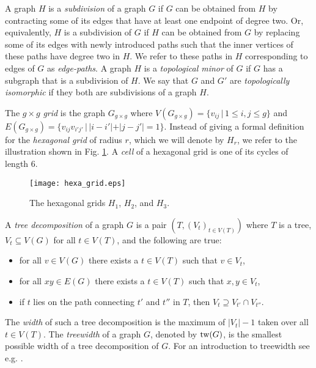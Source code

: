 \documentclass{llncs}
\begin{document}
A graph $H$ is a \emph{subdivision} of a graph $G$ if $G$ can be obtained from $H$
by contracting some of its edges that have at least one endpoint of degree two.
Or, equivalently, $H$ is a subdivision of $G$ if $H$ can be obtained from $G$ by
replacing some of its edges with newly introduced paths
such that the inner vertices of these paths have degree two in $H$.
We refer to these paths in $H$ corresponding to edges of $G$ as \emph{edge-paths}.
A graph $H$ is a \emph{topological minor} of $G$ if $G$ has a subgraph that is a subdivision of $H$.
We say that $G$ and $G'$ are \emph{topologically isomorphic} if they both are subdivisions of a graph $H$.

The $g \times g$ \emph{grid} is the graph $G_{g \times g}$ where
$V(G_{g \times g}) = \{v_{ij} \,|\, 1 \leq i,j \leq g \}$ and
$E(G_{g \times g}) = \{ v_{ij} v_{i'j'} \,|\, |i-i'|+|j-j'| = 1 \}$.
Instead of giving a formal definition for the \emph{hexagonal grid} of radius $r$,
which we will denote by $H_r$, we refer to the illustration shown in Fig. \ref{fig_hexa}.
A \emph{cell} of a hexagonal grid is one of its cycles of length $6$.

\begin{figure}[t]
\begin{center}
\texttt{[image: hexa\_grid.eps]}
\end{center}
\caption{The hexagonal grids $H_1$, $H_2$, and $H_3$.}
\label{fig_hexa}
\end{figure}

A \emph{tree decomposition} of a graph $G$ is a pair $(T,(V_t)_{t \in V(T)})$ where
$T$ is a tree, $V_t \subseteq V(G)$ for all $t \in V(T)$, and the following are true:

\begin{itemize}
\item
for all $v \in V(G)$ there exists a $t \in V(T)$ such that $v \in V_t$,
\item
for all $xy \in E(G)$ there exists a $t \in V(T)$ such that $x,y \in V_t$,
\item
if $t$ lies on the path connecting $t'$ and $t''$ in $T$, then
$V_t \supseteq V_{t'} \cap V_{t''}$.
\end{itemize}

The \emph{width} of such a tree decomposition is the maximum of $|V_t|-1$ taken over all $t \in V(T)$.
The \emph{treewidth} of a graph $G$, denoted by $\textup{tw}(G)$,
is the smallest possible width of a tree decomposition of $G$.
For an introduction to treewidth see e.g. \cite{bod97,die00}.
\end{document}
